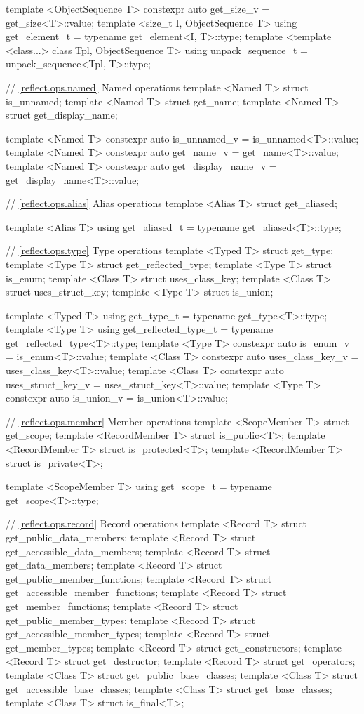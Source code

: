 \begin{std.txt}
\begin{codeblock}
{{template <ObjectSequence T>
  constexpr auto get_size_v = get_size<T>::value;
template <size_t I, ObjectSequence T>
  using get_element_t = typename get_element<I, T>::type;
template <template <class...> class Tpl, ObjectSequence T>
  using unpack_sequence_t = unpack_sequence<Tpl, T>::type;

// \ref{reflect.ops.named} Named operations
template <Named T> struct is_unnamed;
template <Named T> struct get_name;
template <Named T> struct get_display_name;

template <Named T>
  constexpr auto is_unnamed_v = is_unnamed<T>::value;
template <Named T>
  constexpr auto get_name_v = get_name<T>::value;
template <Named T>
  constexpr auto get_display_name_v = get_display_name<T>::value;

// \ref{reflect.ops.alias} Alias operations
template <Alias T> struct get_aliased;

template <Alias T>
  using get_aliased_t = typename get_aliased<T>::type;

// \ref{reflect.ops.type} Type operations
template <Typed T> struct get_type;
template <Type T> struct get_reflected_type;
template <Type T> struct is_enum;
template <Class T> struct uses_class_key;
template <Class T> struct uses_struct_key;
template <Type T> struct is_union;

template <Typed T>
  using get_type_t = typename get_type<T>::type;
template <Type T>
  using get_reflected_type_t = typename get_reflected_type<T>::type;
template <Type T>
  constexpr auto is_enum_v = is_enum<T>::value;
template <Class T>
  constexpr auto uses_class_key_v = uses_class_key<T>::value;
template <Class T>
  constexpr auto uses_struct_key_v = uses_struct_key<T>::value;
template <Type T>
  constexpr auto is_union_v = is_union<T>::value;

// \ref{reflect.ops.member} Member operations
template <ScopeMember T> struct get_scope;
template <RecordMember T> struct is_public<T>;
template <RecordMember T> struct is_protected<T>;
template <RecordMember T> struct is_private<T>;

template <ScopeMember T>
  using get_scope_t = typename get_scope<T>::type;

// \ref{reflect.ops.record} Record operations
template <Record T> struct get_public_data_members;
template <Record T> struct get_accessible_data_members;
template <Record T> struct get_data_members;
template <Record T> struct get_public_member_functions;
template <Record T> struct get_accessible_member_functions;
template <Record T> struct get_member_functions;
template <Record T> struct get_public_member_types;
template <Record T> struct get_accessible_member_types;
template <Record T> struct get_member_types;
template <Record T> struct get_constructors;
template <Record T> struct get_destructor;
template <Record T> struct get_operators;
template <Class T> struct get_public_base_classes;
template <Class T> struct get_accessible_base_classes;
template <Class T> struct get_base_classes;
template <Class T> struct is_final<T>;

}}
\end{codeblock}
\end{std.txt}
